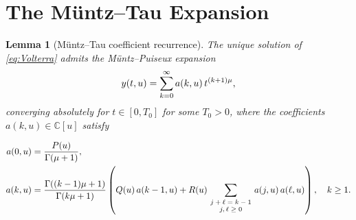 \documentclass{article}
\newcommand{\tmscript}[1]{\text{\scriptsize{$#1$}}}
\newtheorem{lemma}{Lemma}
\newcommand{\C}{\mathbb{C}}
\begin{document}
\section{The M{\"u}ntz--Tau Expansion}\label{sec:Muntz}

\begin{lemma}
  [M{\"u}ntz--Tau coefficient recurrence]\label{lem:Muntz}The unique solution
  of \eqref{eq:Volterra} admits the M{\"u}ntz--Puiseux expansion
  \begin{equation}
    y (t, u) = \sum_{k = 0}^{\infty} a (k, u)  \hspace{0.17em} t^{(k + 1)
    \mu}, \label{eq:Muntzseries}
  \end{equation}
  converging absolutely for $t \in [0, T_0]$ for some $T_0 > 0$, where the
  coefficients $a (k, u) \in \C [u]$ satisfy
  
  \begin{align}
    a (0, u) & = \frac{P (u)}{\Gamma (\mu + 1)},  \label{eq:a0}\\
    a (k, u) & = \frac{\Gamma ((k - 1) \mu + 1)}{\Gamma (k \mu + 1)}  \left( Q
    (u) \hspace{0.17em} a (k - 1, u) + R (u) \hspace{-0.17em} \hspace{-0.17em}
    \sum_{\tmscript{\begin{array}{c}
      j + \ell = k - 1\\
      j, \ell \ge 0
    \end{array}}} \hspace{-0.17em} \hspace{-0.17em} a (j, u) \hspace{0.17em} a
    (\ell, u) \right), \quad k \ge 1.  \label{eq:ak}
  \end{align}
\end{lemma}
\end{document}
